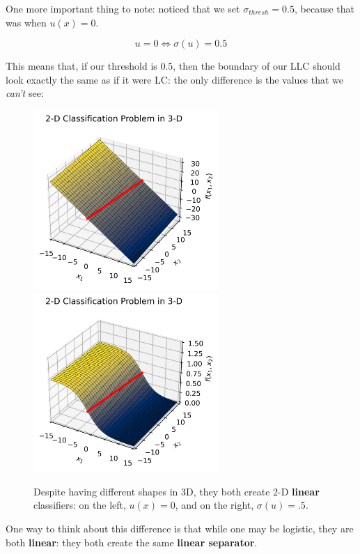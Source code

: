         One more important thing to note: noticed that we set $\sigma_{thresh}=0.5$, because that was when $u(x)=0$.

        \begin{equation}
            u=0 \iff \sigma(u) = 0.5
        \end{equation}
        
        This means that, if our threshold is $0.5$, then the boundary of our LLC should look exactly the same as if it were LC: the only difference is the values that we \textit{can't} see:
        
        \begin{figure}[H]
            \includegraphics[width=70mm,scale=0.5]{images/classification_images/2d_classification_in_3d_plane.png}
            \includegraphics[width=70mm,scale=0.5]{images/classification_images/2d_classification_in_3d_sigmoid.png}
            
            \caption*{Despite having different shapes in 3D, they both create 2-D \textbf{linear} classifiers: on the left, $u(x)=0$, and on the right, $\sigma(u)=.5$.}
        \end{figure}
        
        One way to think about this difference is that while one may be logistic, they are both \textbf{linear}: they both create the same \textbf{linear separator}.
        
